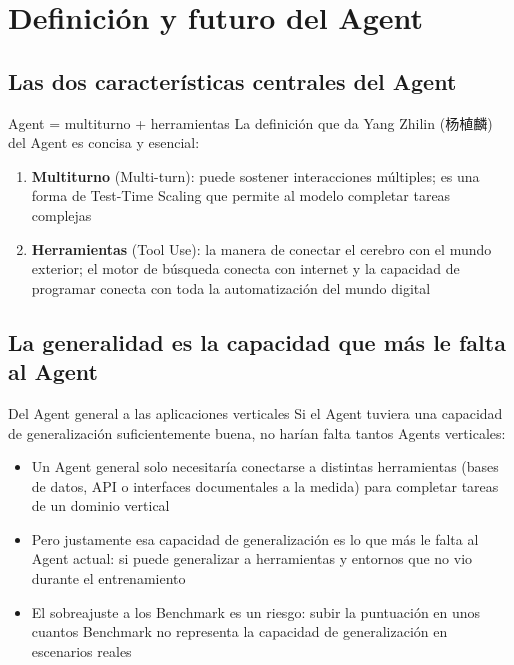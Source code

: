 \section{Definición y futuro del Agent}

\subsection{Las dos características centrales del Agent}

\begin{importantbox}{Agent = multiturno + herramientas}
La definición que da Yang Zhilin (杨植麟) del Agent es concisa y esencial:
\begin{enumerate}
    \item \textbf{Multiturno} (Multi-turn): puede sostener interacciones múltiples; es una forma de Test-Time Scaling que permite al modelo completar tareas complejas
    \item \textbf{Herramientas} (Tool Use): la manera de conectar el cerebro con el mundo exterior; el motor de búsqueda conecta con internet y la capacidad de programar conecta con toda la automatización del mundo digital
\end{enumerate}
\end{importantbox}

\subsection{La generalidad es la capacidad que más le falta al Agent}

\begin{importantbox}{Del Agent general a las aplicaciones verticales}
Si el Agent tuviera una capacidad de generalización suficientemente buena, no harían falta tantos Agents verticales:
\begin{itemize}
    \item Un Agent general solo necesitaría conectarse a distintas herramientas (bases de datos, API o interfaces documentales a la medida) para completar tareas de un dominio vertical
    \item Pero justamente esa capacidad de generalización es lo que más le falta al Agent actual: si puede generalizar a herramientas y entornos que no vio durante el entrenamiento
    \item El sobreajuste a los Benchmark es un riesgo: subir la puntuación en unos cuantos Benchmark no representa la capacidad de generalización en escenarios reales
\end{itemize}
\end{importantbox}

